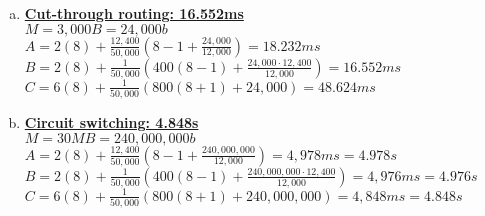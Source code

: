 \documentclass[11pt,fleqn]{article}
\begin{document}
\begin{enumerate}[1)]
\begin{enumerate}[1.]
\begin{enumerate}[(a)]
\item {\bf\underline{Cut-through routing: 16.552ms}} \\ $M = 3,000B = 24,000b$ \\
$\displaystyle A = 2(8) + \frac{12,400}{50,000}(8-1+\frac{24,000}{12,000}) = 18.232 ms$ \\
$\displaystyle B = 2(8) + \frac1{50,000}(400(8-1)+\frac{24,000\cdot12,400}{12,000}) = 16.552 ms$ \\
$\displaystyle C = 6(8) + \frac1{50,000}(800(8+1)+24,000) = 48.624 ms$
\item {\bf\underline{Circuit switching: 4.848s}} \\ $M = 30 MB = 240,000,000 b$ \\
$\displaystyle A = 2(8) + \frac{12,400}{50,000}(8-1+\frac{240,000,000}{12,000}) = 4,978 ms = 4.978 s$ \\
$\displaystyle B = 2(8) + \frac1{50,000}(400(8-1)+\frac{240,000,000\cdot12,400}{12,000}) = 4,976 ms = 4.976 s$ \\
$\displaystyle C = 6(8) + \frac1{50,000}(800(8+1)+240,000,000) = 4,848 ms = 4.848 s$
\end{enumerate}
\end{enumerate}


\end{enumerate}
\end{document}
